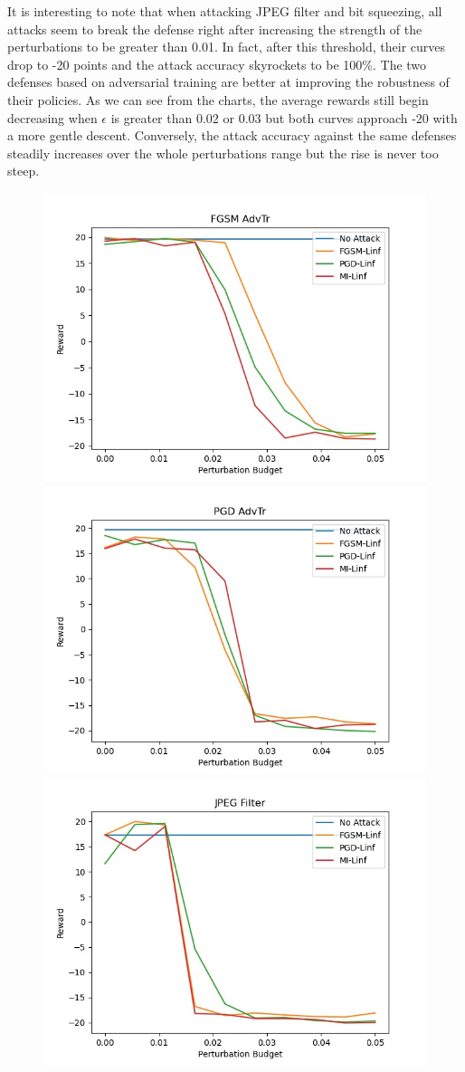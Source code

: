 It is interesting to note that when attacking JPEG filter and bit squeezing, all attacks seem to break the defense right after increasing the strength of the perturbations to be greater than 0.01. In fact, after this threshold, their curves drop to -20 points and the attack accuracy skyrockets to be 100\%. The two defenses based on adversarial training are better at improving the robustness of their policies. As we can see from the charts, the average rewards still begin decreasing when \(\epsilon\) is greater than 0.02 or 0.03 but both curves approach -20 with a more gentle descent. Conversely, the attack accuracy against the same defenses steadily increases over the whole perturbations range but the rise is never too steep.


\begin{figure}
  \centering
    {\includegraphics[width=0.49\linewidth]{images/exp3/untargeted/FGSM_AdvTr.jpg}}
    {\includegraphics[width=0.49\linewidth]{images/exp3/untargeted/PGD_AdvTr.jpg}}
    {\includegraphics[width=0.49\linewidth]{images/exp3/untargeted/JPEG_Filter.jpg}}

\end{figure}
